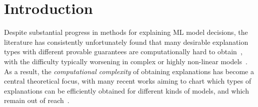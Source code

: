 \documentclass{article}
\newcommand{\z}{\textbf{z}}
\newcommand{\x}{\textbf{x}}
\begin{document}


\section{Introduction}
Despite substantial progress in methods for explaining ML model decisions, the literature has consistently unfortunately found that many desirable explanation types with different provable guarantees are computationally hard to obtain~\citep{BaMoPeSu20, van2022tractability}, with the difficulty typically worsening in complex or highly non-linear models~\citep{BaMoPeSu20, adolfi2024computational, adolfi2024complexity}.
As a result, the \emph{computational complexity} of obtaining explanations has become a central theoretical focus, with many recent works aiming to chart which types of explanations can be efficiently obtained for different kinds of models, and which remain out of reach~\citep{BaMoPeSu20, waldchen2021computational, arenas2022computing, arenas2023complexity, marzouk2024tractability, ordyniak2023parameterized, LABER2024106437, bhattacharjee2024auditing, blanc2021provably, blanc2022query}.



\end{document}
